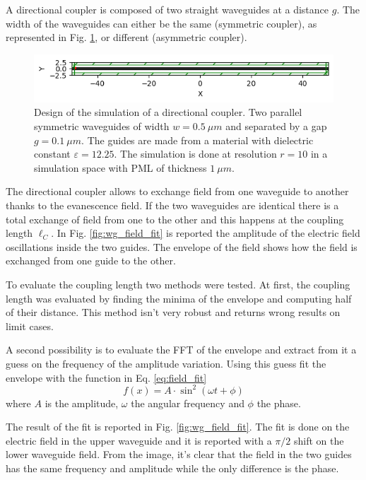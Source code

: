 
A directional coupler is composed of two straight waveguides at a distance $g$. The width of the waveguides can either be the same (symmetric coupler), as represented in Fig. \ref{fig:wg_design}, or different (asymmetric coupler).

\begin{figure}[H]
    \centering
    \includegraphics[width=0.8\linewidth]{Figures/wg_design.png}
    \caption{Design of the simulation of a directional coupler. Two parallel symmetric waveguides of width \(w=0.5\ \mu m\) and separated by a gap \(g=0.1\ \mu m\). The guides are made from a material with dielectric constant \(\varepsilon = 12.25\). The simulation is done at resolution \(r=10\) in a simulation space with PML of thickness \(1\ \mu m\).}
    \label{fig:wg_design}
\end{figure}

The directional coupler allows to exchange field from one waveguide to another thanks to the evanescence field. If the two waveguides are identical there is a total exchange of field from one to the other and this happens at the coupling length $\ell_C$. In Fig. \ref{fig:wg_field_fit} is reported the amplitude of the electric field oscillations inside the two guides. The envelope of the field shows how the field is exchanged from one guide to the other.

To evaluate the coupling length two methods were tested. At first, the coupling length was evaluated by finding the minima of the envelope and computing half of their distance. This method isn't very robust and returns wrong results on limit cases.

A second possibility is to evaluate the FFT of the envelope and extract from it a guess on the frequency of the amplitude variation. Using this guess fit the envelope with the function in Eq. \ref{eq:field_fit}
\begin{equation} \label{eq:field_fit}
    f(x) = A \cdot \sin^2{(\omega t + \phi)}
\end{equation}
where \(A\) is the amplitude, \(\omega\) the angular frequency and \(\phi\) the phase.

The result of the fit is reported in Fig. \ref{fig:wg_field_fit}. The fit is done on the electric field in the upper waveguide and it is reported with a $\pi / 2$ shift on the lower waveguide field. From the image, it's clear that the field in the two guides has the same frequency and amplitude while the only difference is the phase.

